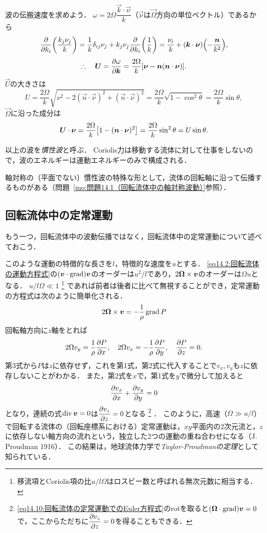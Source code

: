 波の伝搬速度を求めよう．
$\omega=2\Omega \dfrac{\vec{k}\cdot\vec{\nu}}{k}$（$\vec{\nu}$は$\vec{\Omega}$方向の単位ベクトル）であるから
\[
    \pdv{k_i} \pqty{ \frac{k_j\nu_j}{k} } = \frac{1}{k} \delta_{ij} \nu_j + k_j\nu_j \pdv{k_i} \pqty{\frac{1}{k}}
    = \frac{\nu_i}{k} + (\vec{k}\cdot\vec{\nu}) \pqty{ -\frac{\vec{n}}{k^2} } ,
\]
\begin{equation}
    \therefore\quad \vb*{U} = \pdv{\omega}{\vb*{k}} = \frac{2\Omega}{k} [ \vb*{\nu} - \vb*{n}(\vb*{n}\cdot\vb*{\nu}) ] .
\end{equation}
$\vec{U}$の大きさは
\[
    U = \frac{2\Omega}{k} \sqrt{ \nu^2 -2(\vec{n}\cdot\vec{\nu})^2 + (\vec{n}\cdot\vec{\nu})^2 }
    = \frac{2\Omega}{k} \sqrt{1-\cos^2\theta} = \frac{2\Omega}{k} \sin\theta ,
\]
$\vec{\Omega}$に沿った成分は
\[
    \vec{U}\cdot\vec{\nu} = \frac{2\Omega}{k} \bqty{ 1-(\vec{n}\cdot\vec{\nu})^2 }
    = \frac{2\Omega}{k}\sin^2\theta = U \sin\theta .
\]



以上の波を\emph{慣性波}と呼ぶ．
Coriolis力は移動する流体に対して仕事をしないので，波のエネルギーは運動エネルギーのみで構成される．

軸対称の（平面でない）慣性波の特殊な形として，流体の回転軸に沿って伝播するものがある（問題~\ref{mo:問題14.1（回転流体中の軸対称波動）}参照）．


\subsection*{回転流体中の定常運動}
もう一つ，回転流体中の波動伝播ではなく，回転流体中の定常運動について述べておこう．

このような運動の特徴的な長さを$l$，特徴的な速度を$u$とする．
\eqref{eq14.2:回転流体の運動方程式}の$(\vb*{v}\cdot\operatorname{grad})\vb*{v}$のオーダーは$u^2/l$であり，$2\vb*{\Omega}\times\vb*{v}$のオーダーは$\Omega u$となる．
$u/l\Omega \ll 1$
\footnote{移流項とCoriolis項の比$u/l\Omega$はロスビー数と呼ばれる無次元数に相当する．}
であれば前者は後者に比べて無視することができ，定常運動の方程式は次のように簡単化される．
\begin{equation}\label{eq14.10:回転流体の定常運動でのEuler方程式}
    2\vb*{\Omega}\times\vb*{v} = -\frac{1}{\rho} \operatorname{grad} P 
\end{equation}
回転軸方向に$z$軸をとれば
\[
    2\Omega v_y = \frac{1}{\rho} \pdv{P}{x}, \quad
    2\Omega v_x = -\frac{1}{\rho} \pdv{P}{y}, \quad
    \pdv{P}{z} = 0 .
\]
第3式から$P$は$z$に依存せず，これを第1式，第2式に代入することで$v_x,v_y$も$z$に依存しないことがわかる．
また，第2式を$x$で，第1式を$y$で微分して加えると
\[
    \pdv{v_x}{x} + \pdv{v_y}{y} = 0
\]
となり，連続の式$\operatorname{div}\vb*{v}=0$は$\dpdv{v_z}{z}=0$となる
\footnote{\eqref{eq14.10:回転流体の定常運動でのEuler方程式}のrotを取ると$(\vb*{\Omega}\cdot\operatorname{grad})\vb*{v}=0$で，ここからただちに$\dpdv{v_z}{z}=0$を得ることもできる．}
．
このように，高速（$\Omega \gg u/l$）で回転する流体の（回転座標系における）定常運動は，$xy$平面内の2次元流と，$z$に依存しない軸方向の流れという，独立した2つの運動の重ね合わせになる（J. Proudman 1916）．
この結果は，地球流体力学で\emph{Taylor-Proudmanの定理}として知られている．



